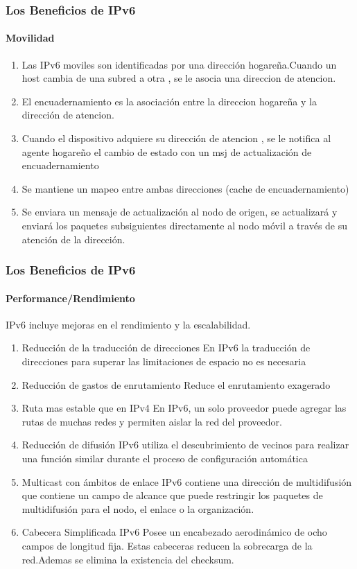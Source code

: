 \documentclass{beamer}
\begin{document}
\begin{frame}
\frametitle{Los Beneficios de IPv6}
\framesubtitle{Movilidad}
\begin{enumerate}
\item Las  IPv6 moviles son identificadas por una dirección hogareña.Cuando un host cambia de una subred a otra , se le asocia una direccion de atencion.
\item El encuadernamiento es la asociación entre la direccion hogareña y la dirección de atencion.
\item Cuando el dispositivo adquiere su dirección de atencion , se le notifica al agente hogareño el cambio de estado con un msj de actualización de encuadernamiento
\item Se mantiene un mapeo entre ambas direcciones (cache de encuadernamiento)  
 \item Se enviara un mensaje 
de actualización al nodo de origen, se actualizará y enviará los paquetes subsiguientes directamente 
al nodo móvil a través de su atención  de la dirección.
\end{enumerate}
\end{frame}

\begin{frame}
\frametitle{Los Beneficios de IPv6}
\framesubtitle{Performance/Rendimiento}

IPv6 incluye mejoras en el rendimiento y la escalabilidad.
\begin{enumerate}
\item Reducción de la traducción de direcciones En IPv6 la traducción de direcciones para superar 
las limitaciones de espacio no es necesaria
\item Reducción de gastos de enrutamiento  Reduce el enrutamiento exagerado
\item Ruta mas estable que  en IPv4 En IPv6, un solo proveedor puede agregar las rutas de muchas redes y permiten 
aislar la red del proveedor.
\item  Reducción de difusión IPv6  utiliza el descubrimiento de vecinos para realizar una función 
similar durante el proceso de configuración automática
 \item Multicast con ámbitos de enlace IPv6 contiene una dirección de multidifusión que contiene un 
campo de alcance que puede restringir los paquetes de multidifusión para el nodo, el enlace o la 
organización.
\item Cabecera Simplificada IPv6 Posee un encabezado aerodinámico de ocho campos de longitud 
fija. Estas cabeceras reducen la sobrecarga de la red.Ademas se elimina la existencia del checksum.

\end{enumerate}
\end{frame}
\end{document}
